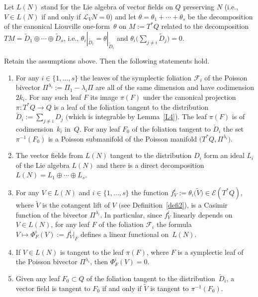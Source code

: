 Let $L(N)$ stand for the Lie algebra of vector fields on $Q$ preserving $N$ (i.e., $V\in L(N)$ if and only if $\mathcal{L}_VN=0$) and let $\theta=\theta_1+\cdots+\theta_s$ be the decomposition of the canonical Liouville one-form~$\theta$ on $M:=T^*Q$ related to the decomposition $TM=\widetilde{ D}_1\oplus\cdots\oplus \widetilde{ D}_s$, i.e., $\theta_i|_{\widetilde{ D}_i}=\theta|_{\widetilde{ D}_i}$ and $\theta_i\big(\sum\limits_{j\not=i}\widetilde{ D}_j\big)=0$.

\begin{Lemma}\label{L56} Retain the assumptions above. Then the following statements hold.
\begin{enumerate}\itemsep=0pt
\item[$1.$] For any $i\in\{1,\dots,s\}$ the leaves of the symplectic foliation $\mathcal{F}_i$ of the Poisson bivector $\Pi^{\lambda_i}:=\Pi_1-\lambda_i\Pi$ are all of the same dimension and have codimension $2k_i$. For any such leaf $F$ its image $\pi(F)$ under the canonical projection $\pi\colon T^*Q\to Q$ is a leaf of the foliation tangent to the distribution $\check D_i:=\sum\limits_{j\not=i}D_j$ $($which is integrable by Lemma~{\rm \ref{L4})}. The leaf $\pi(F)$ is of codimension~$k_i$ in~$Q$. For any leaf $F_0$ of the foliation tangent to $\check D_i$ the set $\pi^{-1}(F_0)$ is a Poisson submanifold of the Poisson manifold $\big(T^*Q,\Pi^{\lambda_i}\big)$.
\item[$2.$] The vector fields from $L(N)$ tangent to the distribution $D_i$ form an ideal $L_i$ of the Lie algebra $L(N)$ and there is a direct decomposition $L(N)=L_1\oplus\cdots\oplus L_s$.
\item[$3.$] For any $V\in L(N)$ and $i\in\{1,\dots,s\}$ the function $f^i_V:=\theta_i\big(\widetilde{ V}\big)\in\mathcal{E}(T^*Q)$, where $\widetilde{ V}$ is the cotangent lift of $V$ $($see Definition~{\rm \ref{defi2})}, is a Casimir function of the bivector $\Pi^{\lambda_i}$. In particular, since $f^i_V$ linearly depends on $V\in L(N)$, for any leaf $F$ of the foliation $\mathcal{F}_i$ the formula $V\mapsto\Phi^i_F(V):=f^i_V|_F$ defines a linear functional on~$L(N)$.
 \item[$4.$] If $V\in L(N)$ is tangent to the leaf $\pi(F)$, where $F$ is a symplectic leaf of the Poisson bivector $\Pi^{\lambda_i}$, then $\Phi^i_F(V)=0$.
 \item[$5.$] Given any leaf $F_0 \subset Q$ of the foliation tangent to the distribution~$\check D_i$, a vector field  is tangent to $F_0$ if and only if $\widetilde{V}$ is tangent to $\pi^{-1}(F_0)$.
\end{enumerate}
 \end{Lemma}

